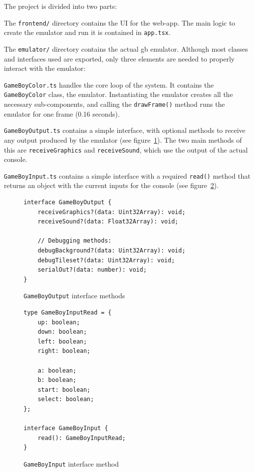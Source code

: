 \documentclass[11pt]{informatics-report}
\begin{document}
The project is divided into two parts:
\begin{compactitem}
    \item The \texttt{frontend/} directory contains the UI for the web-app. The main logic to create the emulator and run it is contained in \texttt{app.tsx}.
    \item  The \texttt{emulator/} directory contains the actual \gls{gb} emulator. Although most classes and interfaces used are exported, only three elements are needed to properly interact with the emulator:
    \begin{compactitem}
        \item \texttt{GameBoyColor.ts} handles the core loop of the system. It contains the \texttt{GameBoyColor} class, the emulator. Instantiating the emulator creates all the necessary sub-components, and calling the \texttt{drawFrame()} method runs the emulator for one frame (0.16 seconds).
        \item \texttt{GameBoyOutput.ts} contains a simple interface, with optional methods to receive any output produced by the emulator (see figure~\ref{fig:gameboyoutput}). The two main methods of this are \texttt{receiveGraphics} and \texttt{receiveSound}, which use the output of the actual console.
        \item \texttt{GameBoyInput.ts} contains a simple interface with a required \texttt{read()} method that returns an object with the current inputs for the console (see figure~\ref{fig:gameboyinput}).
    \end{compactitem}
\end{compactitem}

\begin{figure}[h]
    \begin{verbatim}
interface GameBoyOutput {
    receiveGraphics?(data: Uint32Array): void;
    receiveSound?(data: Float32Array): void;

    // Debugging methods:
    debugBackground?(data: Uint32Array): void;
    debugTileset?(data: Uint32Array): void;
    serialOut?(data: number): void;
}
    \end{verbatim}
    \caption{\texttt{GameBoyOutput} interface methods}
    \label{fig:gameboyoutput}
\end{figure}

\begin{figure}[h]
    \begin{verbatim}
type GameBoyInputRead = {
    up: boolean;
    down: boolean;
    left: boolean;
    right: boolean;

    a: boolean;
    b: boolean;
    start: boolean;
    select: boolean;
};

interface GameBoyInput {
    read(): GameBoyInputRead;
}
    \end{verbatim}
    \caption{\texttt{GameBoyInput} interface method}
    \label{fig:gameboyinput}
\end{figure}
\end{document}
